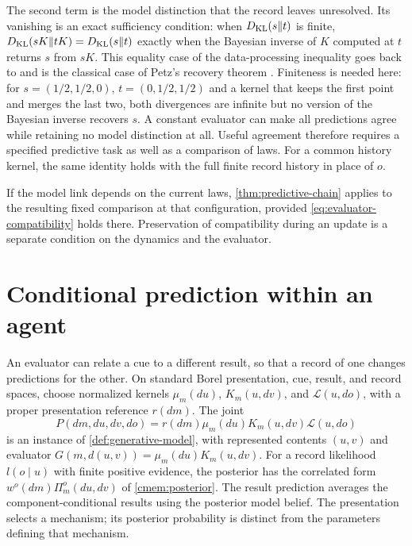 The second term is the model distinction that the record leaves unresolved. Its vanishing is an exact sufficiency condition: when $D_{\mathrm{KL}}(s\Vert t)$ is finite, $D_{\mathrm{KL}}(sK\Vert tK)=D_{\mathrm{KL}}(s\Vert t)$ exactly when the Bayesian inverse of $K$ computed at $t$ returns $s$ from $sK$. This equality case of the data-processing inequality goes back to \citet{KullbackLeibler1951} and is the classical case of Petz's recovery theorem \citep{Petz1988}. Finiteness is needed here: for $s=(1/2,1/2,0)$, $t=(0,1/2,1/2)$ and a kernel that keeps the first point and merges the last two, both divergences are infinite but no version of the Bayesian inverse recovers $s$. A constant evaluator can make all predictions agree while retaining no model distinction at all. Useful agreement therefore requires a specified predictive task as well as a comparison of laws. For a common history kernel, the same identity holds with the full finite record history in place of $o$.

If the model link depends on the current laws, \cref{thm:predictive-chain} applies to the resulting fixed comparison at that configuration, provided \cref{eq:evaluator-compatibility} holds there. Preservation of compatibility during an update is a separate condition on the dynamics and the evaluator.

\section{Conditional prediction within an agent}
\label{sec:conditional-prediction}

An evaluator can relate a cue to a different result, so that a record of one changes predictions for the other. On standard Borel presentation, cue, result, and record spaces, choose normalized kernels $\mu_m(du)$, $K_m(u,dv)$, and $\mathcal L(u,do)$, with a proper presentation reference $r(dm)$. The joint
\begin{equation}
 P(dm,du,dv,do)=r(dm)\mu_m(du)K_m(u,dv)\mathcal L(u,do)
 \label{eq:conditional-prediction-model}
\end{equation}
is an instance of \cref{def:generative-model}, with represented contents $(u,v)$ and evaluator $G(m,d(u,v))=\mu_m(du)K_m(u,dv)$. For a record likelihood $l(o\mid u)$ with finite positive evidence, the posterior has the correlated form $w^o(dm)\Pi_m^o(du,dv)$ of \cref{cmem:posterior}. The result prediction averages the component-conditional results using the posterior model belief. The presentation selects a mechanism; its posterior probability is distinct from the parameters defining that mechanism.

